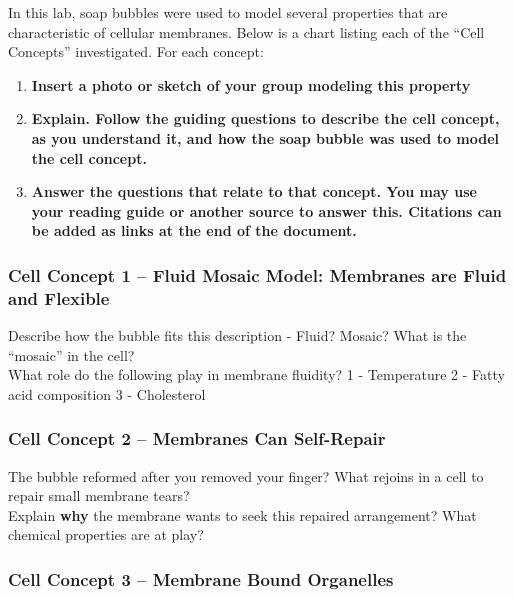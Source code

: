 \documentclass[letterpaper]{article}
\begin{document}
In this lab, soap bubbles were used to model several properties that are characteristic of cellular membranes. Below is a chart listing each of the ``Cell Concepts'' investigated. For each concept:

\begin{enumerate}
\def\labelenumi{\arabic{enumi}.}
\item
  \textbf{Insert a photo or sketch of your group modeling this property}
\item
  \textbf{Explain. Follow the guiding questions to describe the cell concept, as you understand it, and how the soap bubble was used to model the cell concept.}
\item
  \textbf{Answer the questions that relate to that concept. You may use your reading guide or another source to answer this. Citations can be added as links at the end of the document.}
\end{enumerate}

\subsubsection*{Cell Concept 1 -- Fluid Mosaic Model: Membranes are Fluid and Flexible}\label{cell-concept-1-fluid-mosaic-model-membranes-are-fluid-and-flexible}

Describe how the bubble fits this description - Fluid? Mosaic? What is the ``mosaic'' in the cell?\\
What role do the following play in membrane fluidity? 1 - Temperature 2 - Fatty acid composition 3 - Cholesterol

\subsubsection*{Cell Concept 2 -- Membranes Can Self-Repair}\label{cell-concept-2-membranes-can-self-repair}

The bubble reformed after you removed your finger? What rejoins in a cell to repair small membrane tears?\\
Explain \textbf{why} the membrane wants to seek this repaired arrangement? What chemical properties are at play?

\subsubsection*{Cell Concept 3 -- Membrane Bound Organelles}\label{cell-concept-3-membrane-bound-organelles}
\end{document}
